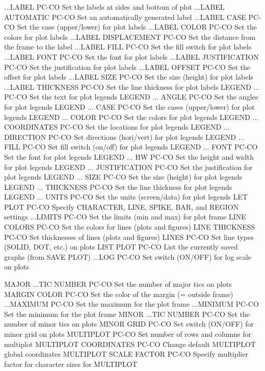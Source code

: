 ...LABEL                    PC-CO Set the labels at sides and bottom of plot
...LABEL AUTOMATIC          PC-CO Set an automatically generated label
...LABEL CASE               PC-CO Set the case (upper/lower) for plot labels
...LABEL COLOR              PC-CO Set the colors for plot labels
...LABEL DISPLACEMENT       PC-CO Set the distance from the frame to the label
...LABEL FILL               PC-CO Set the fill switch for plot labels
...LABEL FONT               PC-CO Set the font for plot labels
...LABEL JUSTIFICATION      PC-CO Set the justification for plot labels
...LABEL OFFSET             PC-CO Set the offset for plot labels
...LABEL SIZE               PC-CO Set the size (height) for plot labels
...LABEL THICKNESS          PC-CO Set the line thickness for plot labels
LEGEND ...                  PC-CO Set the text for plot legends
LEGEND ... ANGLE            PC-CO Set the angles for plot legends
LEGEND ... CASE             PC-CO Set the cases (upper/lower) for plot legends
LEGEND ... COLOR            PC-CO Set the colors for plot legends
LEGEND ... COORDINATES      PC-CO Set the locations for plot legends
LEGEND ... DIRECTION        PC-CO Set directions (hori/vert) for plot legends
LEGEND ... FILL             PC-CO Set fill switch (on/off) for plot legends
LEGEND ... FONT             PC-CO Set the font for plot legends
LEGEND ... HW               PC-CO Set the height and width for plot legends
LEGEND ... JUSTIFICATION    PC-CO Set the justification for plot legends
LEGEND ... SIZE             PC-CO Set the size (height) for plot legends
LEGEND ... THICKNESS        PC-CO Set the line thickness for plot legends
LEGEND ... UNITS            PC-CO Set the units (screen/data) for plot legends
LET PLOT                    PC-CO Specify CHARACTER, LINE, SPIKE, BAR, and REGION settings
...LIMITS                   PC-CO Set the limits (min and max) for plot frame
LINE COLORS                 PC-CO Set the colors for lines (plots and figures)
LINE THICKNESS              PC-CO Set thicknesses of lines (plots and figures)
LINES                       PC-CO Set line types (SOLID, DOT, etc.) on plots
LIST PLOT                   PC-CO List the currently saved graphs (from SAVE PLOT)
...LOG                      PC-CO Set switch (ON/OFF) for log scale on plots

MAJOR ...TIC NUMBER         PC-CO Set the number of major tics on plots
MARGIN COLOR                PC-CO Set the color of the margin (= outside frame)
...MAXIMUM                  PC-CO Set the maximum for the plot frame
...MINIMUM                  PC-CO Set the minimum for the plot frame
MINOR ...TIC NUMBER         PC-CO Set the number of minor tics on plots
MINOR GRID                  PC-CO Set switch (ON/OFF) for minor grid on plots
MULTIPLOT                   PC-CO Set number of rows and columns for multiplot
MULTIPLOT COORDINATES       PC-CO Change default MULTIPLOT global coordinates
MULTIPLOT SCALE FACTOR      PC-CO Specify multiplier factor for character sizes for MULTIPLOT

